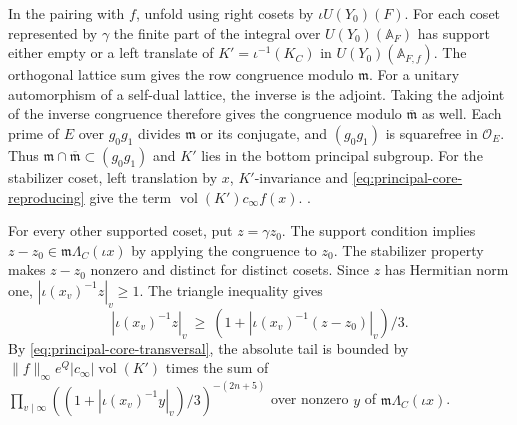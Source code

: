 In the pairing with \(f\), unfold using right cosets by
\(\iota U(Y_0)(F)\). For each coset represented by \(\gamma\)
the finite part of the integral over \(U(Y_0)(\mathbb A_F)\)
has support either empty or a left translate of
\(K'=\iota^{-1}(K_C)\) in \(U(Y_0)(\mathbb A_{F,f})\).
The orthogonal lattice sum gives the row congruence modulo
\(\mathfrak m\). For a unitary automorphism of a self-dual
lattice, the inverse is the adjoint. Taking the adjoint of
the inverse congruence therefore gives the congruence modulo
\(\overline{\mathfrak m}\) as well. Each prime of \(E\) over
\(g_0g_1\) divides \(\mathfrak m\) or its conjugate, and
\((g_0g_1)\) is squarefree in \(\mathcal O_E\). Thus
\(\mathfrak m\cap\overline{\mathfrak m}\subset(g_0g_1)\)
and \(K'\) lies in the bottom principal subgroup. For the
stabilizer coset, left translation
by \(x\), \(K'\)-invariance and
\eqref{eq:principal-core-reproducing} give the term
\(\operatorname{vol}(K')c_\infty f(x)\).
.

For every other supported coset, put \(z=\gamma z_0\).
The support condition implies \(z-z_0\in\mathfrak m
\Lambda_C(\iota x)\) by applying the congruence to \(z_0\).
The stabilizer property makes \(z-z_0\) nonzero and distinct
for distinct cosets. Since \(z\) has Hermitian norm one,
\(|\iota(x_v)^{-1}z|_v\ge1\). The triangle inequality gives
\[
 |\iota(x_v)^{-1}z|_v
 \ \ge\ (1+|\iota(x_v)^{-1}(z-z_0)|_v)/3 .
\]
By \eqref{eq:principal-core-transversal}, the absolute tail is
bounded by \(\|f\|_\infty e^Q|c_\infty|\operatorname{vol}(K')\)
times the sum of
\(\prod_{v\mid\infty}((1+|\iota(x_v)^{-1}y|_v)/3)^{-(2n+5)}\)
over nonzero \(y\) of \(\mathfrak m\Lambda_C(\iota x)\).

